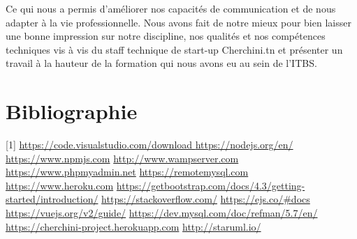 Ce qui nous a permis d'am\'{e}liorer nos capacit\'{e}s de communication et de nous adapter \`{a} la vie professionnelle. Nous avons fait de notre mieux pour bien laisser une bonne impression sur notre discipline, nos qualit\'{e}s et nos comp\'{e}tences techniques vis \`{a} vis du staff technique de start-up Cherchini.tn et pr\'{e}senter un travail \`{a} la hauteur de la formation qui nous avons
eu au sein de l'ITBS.

\chapter*{Bibliographie}

[1]  \url{https://code.visualstudio.com/download } \newline
[2]  \url{https://nodejs.org/en/ }  \newline
[3]  \url{https://www.npmjs.com} \newline
[4]  \url{http://www.wampserver.com} \newline
[5]  \url{https://www.phpmyadmin.net}   \newline
[6]  \url{https://remotemysql.com}   \newline
[7]  \url{https://www.heroku.com}   \newline
[8]  \url{https://getbootstrap.com/docs/4.3/getting-started/introduction/}   \newline
[9]  \url{https://stackoverflow.com/}   \newline
[10] \url{https://ejs.co/#docs} \newline
[11] \url{https://vuejs.org/v2/guide/}  \newline
[12] \url{https://dev.mysql.com/doc/refman/5.7/en/}  \newline
[13] \url{https://cherchini-project.herokuapp.com}  \newline
[14] \url{http://staruml.io/}  \newline

